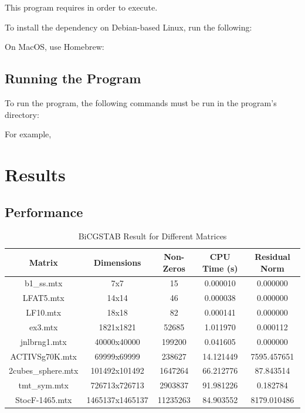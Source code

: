 \documentclass[12pt]{article}
\begin{document}
This program requires  in order to execute. 

    To install the dependency on Debian-based Linux, run the following:
    
    

    On MacOS, use Homebrew:
    
    

\subsection{Running the Program}

 To run the program, the following commands must be run in the program's directory:
 
 

 For example, 
 
 

\section{Results}

\subsection{Performance}

\begin{table}[h]
  \centering
  \caption{BiCGSTAB Result for Different Matrices}
  \begin{tabular}{ccccc} %
    \toprule
    \textbf{Matrix} & \textbf{Dimensions} & \textbf{Non-Zeros} & \textbf{CPU Time (s)} & \textbf{Residual Norm} \\
    \midrule
    b1\_ss.mtx         & 7x7             & 15       & 0.000010  & 0.000000 \\
    LFAT5.mtx          & 14x14           & 46       & 0.000038  & 0.000000 \\
    LF10.mtx           & 18x18           & 82       & 0.000141  & 0.000000 \\
    ex3.mtx            & 1821x1821       & 52685    & 1.011970  & 0.000112 \\
    jnlbrng1.mtx       & 40000x40000     & 199200   & 0.041605  & 0.000000 \\
    ACTIVSg70K.mtx     & 69999x69999     & 238627   & 14.121449 & 7595.457651 \\
    2cubes\_sphere.mtx & 101492x101492   & 1647264  & 66.212776 & 87.843514 \\
    tmt\_sym.mtx       & 726713x726713   & 2903837  & 91.981226 & 0.182784 \\
    StocF-1465.mtx     & 1465137x1465137 & 11235263 & 84.903552 & 8179.010486 \\
    \bottomrule
  \end{tabular}
\end{table}
\end{document}
